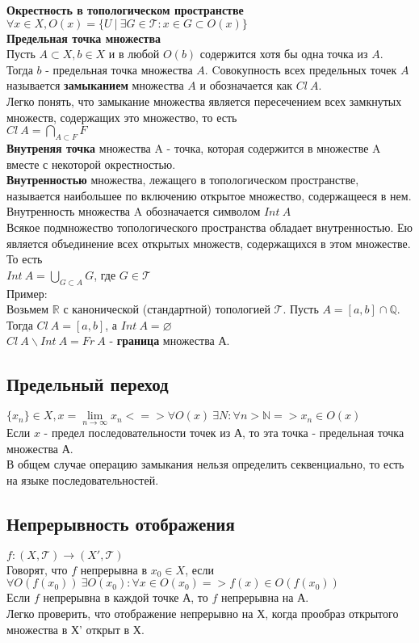 \newpage
\noindent \textbf{Окрестность в топологическом пространстве} \\
$\forall x \in X, O(x) = \{ U \ | \ \exists G \in \mathcal{T}: x \in G \subset O(x) \}$ 
\\
\textbf{Предельная точка множества} 
\\ 
Пусть $A \subset X, b \in X $ и в любой $O(b)$ содержится хотя бы одна точка из $A$. 
Тогда $b$ - предельная точка множества $A$. 
Cовокупность всех предельных точек $A$ называется \textbf{замыканием} множества $A$ и обозначается как $Cl \ A$.
\\
Легко понять, что замыкание множества является пересечением всех замкнутых
множеств, содержащих это множество, то есть 
\\
$Cl \ A = \bigcap\limits_{A \subset F} F$ 
\\
\textbf{Внутреняя точка} множества A - точка, которая содержится в множестве A
вместе с некоторой окрестностью. \\
\textbf{Внутренностью} множества, лежащего в топологическом пространстве,
называется наибольшее по включению открытое множество, содержащееся
в нем. Внутренность множества A обозначается символом $Int \ A$ 
\\
Всякое подмножество топологического пространства обладает внутренностью. Ею
является объединение всех открытых множеств, содержащихся в этом 
множестве. То есть 
\\
$Int \ A = \bigcup\limits_{G \subset A}G$, где $G \in \mathcal{T}$ 
\\
Пример: \\
Возьмем $\mathbb{R}$ с канонической (стандартной) топологией $\mathcal{T}$.
Пусть $A =[a, b] \cap \mathbb{Q}$.
Тогда $Cl \ A = [a, b]$, а
$Int \ A = \varnothing$ 
\\
$Cl \ A \backslash Int \ A = Fr \ A$ - \textbf{граница} множества А.
\subsection{Предельный переход}
$\{x_n\} \in X, x = \lim\limits_{n \to \infty} x_n <=> \forall O(x) \ \exists N : \forall n > \mathbb{N} => x_n \in O(x)$
\\
Если $x$ - предел последовательности точек из А, то эта точка - предельная
точка множества А.
\\
В общем случае операцию замыкания нельзя определить секвенциально, то
есть на языке последовательностей.
\subsection{Непрерывность отображения}
$f\colon (X, \mathcal{T}) \to (X', \mathcal{T})$
\\
Говорят, что $f$ непрерывна в $x_0 \in X$, если $\forall O(f(x_0)) \ \exists O(x_0) : \forall x \in O(x_0) => f(x) \in O(f(x_0))$ 
\\
Если $f$ непрерывна в каждой точке А, то $f$ непрерывна на А. 
\\
Легко проверить, что отображение непрерывно на Х, когда прообраз открытого
множества в Х' открыт в Х.
